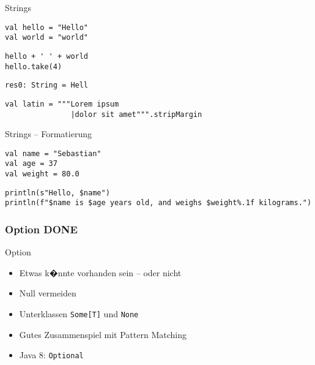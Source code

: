\documentclass[14pt,aspectratio=169,trans]{beamer} %
\begin{document}
\begin{frame}[fragile]{}
	\begin{block}{Strings}
		\scriptsize
		\onslide<2->
  \begin{lstlisting}
val hello = "Hello"
val world = "world"
	\end{lstlisting}
\begin{lstlisting}[firstnumber=3]
hello + ' ' + world
hello.take(4)
\end{lstlisting}
\begin{lstlisting}[firstnumber=5]
res0: String = Hell
\end{lstlisting}
\begin{lstlisting}[firstnumber=6]
val latin = """Lorem ipsum
               |dolor sit amet""".stripMargin
\end{lstlisting}


\end{block}
	
\end{frame}


\begin{frame}[fragile]{}
	\begin{block}{Strings -- Formatierung}
		\scriptsize
		\onslide<1->
\begin{lstlisting}
val name = "Sebastian"
val age = 37
val weight = 80.0
\end{lstlisting}
\begin{lstlisting}[firstnumber=4]
println(s"Hello, $name")
println(f"$name is $age years old, and weighs $weight%.1f kilograms.")
\end{lstlisting}
	\end{block}
\end{frame}




\subsubsection*{Option DONE}

\begin{frame}{}
	\begin{block}{Option}
		\begin{itemize}
			\item<2->Etwas k�nnte vorhanden sein -- oder nicht
			\item<3->Null vermeiden
			\item<4->Unterklassen \texttt{Some[T]} und \texttt{None}
			\item<5->Gutes Zusammenspiel mit Pattern Matching
			\item<6->Java 8: \texttt{Optional}
		\end{itemize}
	\end{block}
	\note{}
\end{frame}
\end{document}
